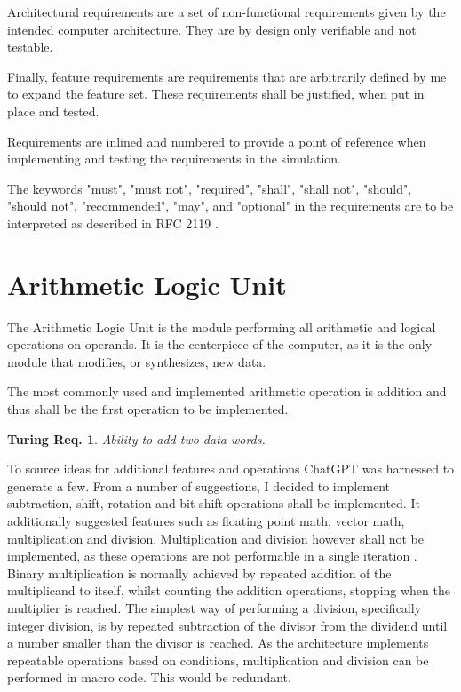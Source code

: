 Architectural requirements are a set of non-functional requirements given by the intended computer architecture. They are by design only verifiable and not testable.

Finally, feature requirements are requirements that are arbitrarily defined by me to expand the feature set. These requirements shall be justified, when put in place and tested.

Requirements are inlined and numbered to provide a point of reference when implementing and testing the requirements in the simulation. 

\newtheorem{turing-requirement}{Turing Req.}[section]
\newtheorem{arch-requirement}{Arch. Req.}[section]
\newtheorem{feat-requirement}{Feat. Req.}[section]

The keywords "must", "must not", "required", "shall", "shall not", "should", "should not", "recommended",  "may", and "optional" in the requirements are to be interpreted as described in RFC 2119 \cite{rfc2119}.


\section{Arithmetic Logic Unit}
The Arithmetic Logic Unit is the module performing all arithmetic and logical operations on operands. It
is the centerpiece of the computer, as it is the only module that modifies, or synthesizes, new data.

The most commonly used and implemented arithmetic operation is addition and thus shall be the first operation to be implemented.
\begin{turing-requirement}
  Ability to add two data words.
\end{turing-requirement}

To source ideas for additional features and operations ChatGPT was harnessed to generate a few. From a number of suggestions, I decided to implement subtraction, shift, rotation and bit shift operations shall be implemented. It additionally suggested features such as floating point math, vector math, multiplication and division. Multiplication and division however shall not be implemented, as these operations are not performable in a single iteration \cite{chatgptalu}.
Binary multiplication is normally achieved by repeated addition of the multiplicand to itself, whilst counting the addition operations, stopping when the multiplier is reached. The simplest way of performing a division, specifically integer division, is by repeated subtraction of the divisor from the dividend until a number smaller than the divisor is reached. As the architecture implements repeatable operations based on conditions, multiplication and division can be performed in macro code. This would be redundant.

